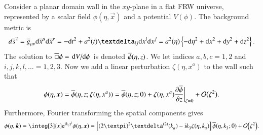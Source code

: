 



\newpage


\begin{draft}%
    Consider a planar domain wall in the $xy$-plane in a flat FRW universe, represented by a scalar field $\phi(\eta, \vec{x})$ and a potential $V(\phi)$. The background metric is
    \begin{equation}
        d\widebar{s}^2 = \widebar{g}\indices{_{\mu\nu}} \diff \widebar{x}\indices{^\mu} \diff\widebar{x}\indices{^\nu} = -\diff t^2 + a^2(t) \Krondelta{_{ij}} \diff x^i \diff x^j = a^2 (\eta) \cclosed{-\diff\eta^2  + \diff x^2 +\diff  y^2 + \diff z^2}.
    \end{equation}
    The solution to $\widebar{\sq} \phi=\dv*{V}{\phi}$ is denoted $\overline{\phi}(\eta, z)$. We let indices $a,b,c=1,2$ and $i,j,k,l,\ldots =1,2,3$. Now we add a linear perturbation $\zeta(\eta, x^a)$ to the wall such that
    \begin{equation}
        \phi(\eta, \boldsymbol{x}) = \overline{\phi}(\eta, z; \zeta(\eta, x^a)) = \overline{\phi}(\eta, z; 0) + \zeta(\eta, x^a) \pdv{\overline{\phi}}{z}\bigg|_{\zeta=0} + \mathcal{O}\big(\zeta^2\big).
    \end{equation}
    Furthermore, Fourier transforming  the spatial components gives
    \begin{equation}
        \phi(\eta,\vec{k}) = \integ[3]{x} \eu[\im k\lo{i} x\up{i}] \phi(\eta,\vec{x})= \bclosed{ (2\ppi)^2 \Diracdelta[2]{k\lo{a}}- \im k\lo{3} \zeta(\eta, k\lo{a}) } \widebar{\phi}(\eta, k\lo{3}; 0) + \order{\zeta^2 }.
    \end{equation}


\end{draft}

